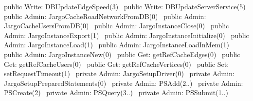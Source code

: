 public \LA{}Write: DBUpdateEdgeSpeed(3)~{\nwtagstyle{}}\RA{}
public \LA{}Write: DBUpdateServerService(5)~{\nwtagstyle{}}\RA{}
\nwendcode{}\nwdocspar
{}
\nwenddocs{}\plusendmoddef
public \LA{}Admin: JargoCacheRoadNetworkFromDB(0)~{\nwtagstyle{}}\RA{}
public \LA{}Admin: JargoCacheUsersFromDB(0)~{\nwtagstyle{}}\RA{}
public \LA{}Admin: JargoInstanceClose(0)~{\nwtagstyle{}}\RA{}
public \LA{}Admin: JargoInstanceExport(1)~{\nwtagstyle{}}\RA{}
public \LA{}Admin: JargoInstanceInitialize(0)~{\nwtagstyle{}}\RA{}
public \LA{}Admin: JargoInstanceLoad(1)~{\nwtagstyle{}}\RA{}
public \LA{}Admin: JargoInstanceLoadInMem(1)~{\nwtagstyle{}}\RA{}
public \LA{}Admin: JargoInstanceNew(0)~{\nwtagstyle{}}\RA{}
public \LA{}Get: getRefCacheEdges(0)~{\nwtagstyle{}}\RA{}
public \LA{}Get: getRefCacheUsers(0)~{\nwtagstyle{}}\RA{}
public \LA{}Get: getRefCacheVertices(0)~{\nwtagstyle{}}\RA{}
public \LA{}Set: setRequestTimeout(1)~{\nwtagstyle{}}\RA{}
private \LA{}Admin: JargoSetupDriver(0)~{\nwtagstyle{}}\RA{}
private \LA{}Admin: JargoSetupPreparedStatements(0)~{\nwtagstyle{}}\RA{}
private \LA{}Admin: PSAdd(2..)~{\nwtagstyle{}}\RA{}
private \LA{}Admin: PSCreate(2)~{\nwtagstyle{}}\RA{}
private \LA{}Admin: PSQuery(3..)~{\nwtagstyle{}}\RA{}
private \LA{}Admin: PSSubmit(1..)~{\nwtagstyle{}}\RA{}
\nwendcode{}\nwdocspar

